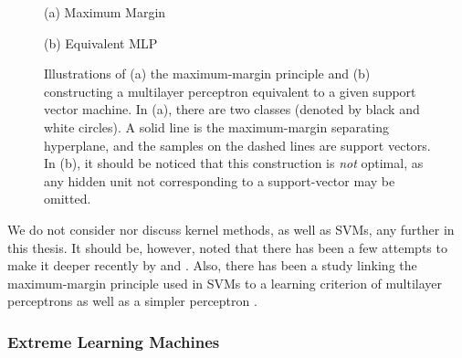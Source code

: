 \documentclass{now}
\begin{document}
\begin{figure}[t]
    \vspace{2mm}
    \begin{minipage}{0.48\textwidth}
        \centering
        \small
        (a) Maximum Margin
    \end{minipage}
    \begin{minipage}{0.48\textwidth}
        \centering
        \small
        (b) Equivalent MLP
    \end{minipage}
    \caption{Illustrations of (a) the maximum-margin
    principle and (b) constructing a multilayer
    perceptron equivalent to a given support vector machine.
    In (a), there are two classes (denoted by black and
    white circles). A solid line is the maximum-margin
    separating hyperplane, and the samples on the dashed
    lines are support vectors. In (b), it should be noticed
    that this construction is \textit{not} optimal, as any
    hidden unit not corresponding to a support-vector may be
    omitted.}
    \label{fig:svm}
\end{figure}



We do not consider nor discuss kernel methods, as
well as SVMs, any further in this thesis.  It should be,
however, noted that there has been a few attempts to make it
deeper recently by \citet{Cho2009} and \citet{Damianou2012}.
Also, there has been a study linking the maximum-margin
principle used in SVMs to a learning criterion of
multilayer perceptrons as well as a simpler perceptron
\citep[see, e.g.,][]{Collobert2004}.

\subsubsection{Extreme Learning Machines}
\label{sec:elm}
\end{document}
